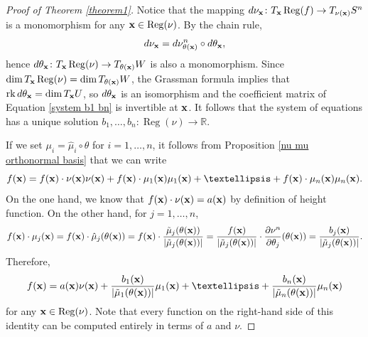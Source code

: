 \documentclass[10pt,a4paper]{amsart}
\DeclareMathOperator{\Reg}{Reg}
\newcommand{\mb}{\mathbb}
\begin{document}
\begin{proof}[Proof of Theorem \ref{theorem1}]
	{\color{black}Notice that} the mapping 
	$d\nu_{\color{black}\bf x}\colon T_{\color{black}\bf x}\Reg(f) 
	\to T_{\nu({\color{black}\bf x})}S^n$ 
	is a monomorphism {\color{black}for any ${\bf x} \in \Reg(\nu)$}.    
	By the chain rule, 
		\[d\nu_{\color{black}\bf x}=
		d\nu^n_{\theta({\color{black}\bf x})}\circ d\theta_{\color{black}\bf x},\]
	hence $d\theta_{\color{black}\bf x}\colon 
	T_{\color{black}\bf x}\Reg(\nu) \to 
	T_{\theta({\color{black}\bf x})}W$ is also a monomorphism.
	Since $\dim T_{\color{black}\bf x}\Reg(\nu) 
	= \dim T_{\theta({\color{black}\bf x})}W$, 
	the Grassman formula implies that $\operatorname{rk} 
	d\theta_{\color{black}\bf x}=\dim T_{\color{black}\bf x}U$, 
	so $d\theta_{\color{black}\bf x}$ is an isomorphism and the coefficient matrix of Equation \eqref{system b1 bn} is invertible at ${\color{black}\bf x}$.
	It follows that the system of equations has a unique solution $b_1,\dots,b_n\colon \Reg(\nu) \to \mb{R}$.

	If we set $\mu_i=\hat\mu_i\circ \theta$ for $i=1,\dots,n$, it follows from Proposition \ref{nu mu orthonormal basis} that we can write 
		\[
		f({\color{black}\bf x})
		=f({\color{black}\bf x})\cdot 
		\nu({\color{black}\bf x})\nu({\color{black}\bf x})
		+f({\color{black}\bf x})\cdot 
		\mu_1({\color{black}\bf x})\mu_1({\color{black}\bf x})
		+\dots+f({\color{black}\bf x})\cdot 
		\mu_n({\color{black}\bf x}) \mu_n({\color{black}\bf x}).
		\] 
	On the one hand, 
	we know that $f({\color{black}\bf x})\cdot 
	\nu({\color{black}\bf x})=
	a({\color{black}\bf x})$ by definition of height function.
	On the other hand, for $j=1,\dots,n$,
		\[f({\color{black}\bf x})\cdot\mu_j({\color{black}\bf x})
		=f({\color{black}\bf x})\cdot \hat 
		\mu_j(\theta({\color{black}\bf x}))
		=f({\color{black}\bf x})\cdot 
		\frac{\tilde \mu_j(\theta({\color{black}\bf x}))}
		{|\tilde \mu_j(\theta({\color{black}\bf x}))|}
		=\frac{f({\color{black}\bf x})}
		{|\tilde \mu_j(\theta({\color{black}\bf x}))|}
		\cdot\frac{\partial \nu^n}{\partial \theta_j}
		(\theta({\color{black}\bf x}))
		=\frac{b_j({\color{black}\bf x})}
		{|\tilde\mu_j(\theta({\color{black}\bf x}))|}.\]
	Therefore,
	\begin{equation}\label{equation to recover f}
		f({\color{black}\bf x})
		=a({\color{black}\bf x})\nu({\color{black}\bf x})
		+\frac{b_1({\color{black}\bf x})}{|\tilde\mu_1(\theta({\color{black}\bf x}))|}
		\mu_1({\color{black}\bf x})+\dots
		+\frac{b_n({\color{black}\bf x})}{|\tilde\mu_n(\theta({\color{black}\bf x}))|}
		\mu_n({\color{black}\bf x})
	\end{equation}
	for any ${\color{black}\bf x} \in \Reg(\nu)$.
	Note that every function on the right-hand side of this identity can be computed entirely in terms of $a$ and $\nu$.
	

\end{proof}
\end{document}
